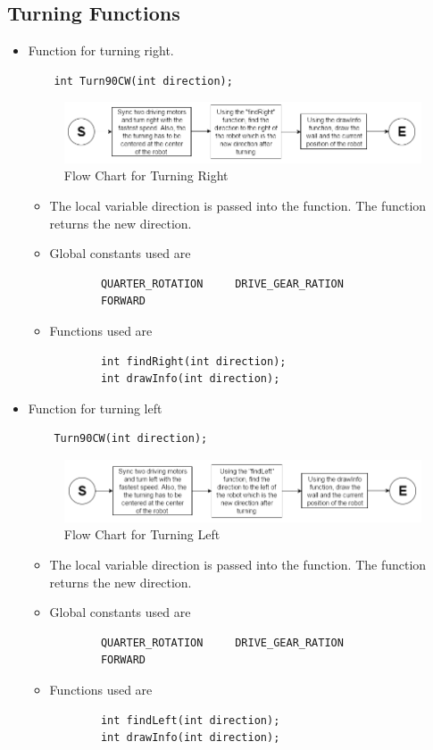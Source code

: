 \documentclass[11pt]{article}
\begin{document}

\subsection{Turning Functions}
\begin{itemize}
\item Function for turning right.
\begin{verbatim}
	int Turn90CW(int direction);
\end{verbatim}
\begin{figure}[htp]
\centering
\includegraphics[scale=0.6]{images/Software_Flowchart/Turning_Right.png}
\caption{Flow Chart for Turning Right}
\label{}
\end{figure}
	\begin{itemize}
	\item The local variable direction is passed into the function. The function returns the new direction.
	\item Global constants used are
	\begin{verbatim}
		QUARTER_ROTATION     DRIVE_GEAR_RATION
		FORWARD
	\end{verbatim}
	\item Functions used are
	\begin{verbatim}
		int findRight(int direction);
		int drawInfo(int direction);
	\end{verbatim}
	\end{itemize}
\item Function for turning left 
\begin{verbatim}
	Turn90CW(int direction);
\end{verbatim}
\begin{figure}[htp]
\centering
\includegraphics[scale=0.60]{images/Software_Flowchart/Turning_Left.png}
\caption{Flow Chart for Turning Left}
\label{}
\end{figure}
	\begin{itemize}
	\item The local variable direction is passed into the function. The function returns the new direction.
	\item Global constants used are
	\begin{verbatim}
		QUARTER_ROTATION     DRIVE_GEAR_RATION
		FORWARD
	\end{verbatim}
	\item Functions used are
	\begin{verbatim}
		int findLeft(int direction);
		int drawInfo(int direction);
	\end{verbatim}
	\end{itemize}
\end{itemize}
\newpage
\end{document}
